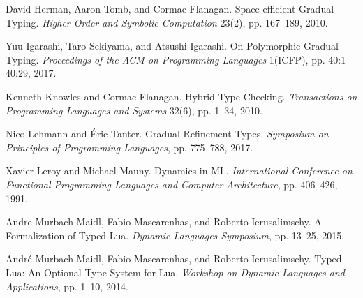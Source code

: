 \documentclass[screen=true, 10pt, acmsmall]{acmart}
\newenvironment{SingleColumn}{\begin{list}{}{\topsep=0pt\partopsep=0pt%
\listparindent=0pt\itemindent=0pt\labelwidth=0pt\leftmargin=0pt\rightmargin=0pt%
\itemsep=0pt\parsep=0pt}\item}{\end{list}}
\newenvironment{AutoBibliography}{\begin{small}}{\end{small}}
\newcommand{\Autobibentry}[1]{\hspace{0.05\linewidth}\parbox[t]{0.95\linewidth}{\parindent=-0.05\linewidth#1\vspace{1.0ex}}}
\begin{document}
\begin{AutoBibliography}
\begin{SingleColumn}
\label{t:x28autobib_x22David_Hermanx2c_Aaron_Tombx2c_and_Cormac_FlanaganSpacex2defficient_Gradual_TypingHigherx2dOrder_and_Symbolic_Computation_23x282x29x2c_ppx2e_167x2dx2d1892010x22x29}\Autobibentry{David Herman, Aaron Tomb, and Cormac Flanagan. Space{-}efficient Gradual Typing. \textit{Higher{-}Order and Symbolic Computation} 23(2), pp. 167{--}189, 2010.}

\label{t:x28autobib_x22Yuu_Igarashix2c_Taro_Sekiyamax2c_and_Atsushi_IgarashiOn_Polymorphic_Gradual_TypingProceedings_of_the_ACM_on_Programming_Languages_1x28ICFPx29x2c_ppx2e_40x3a1x2dx2d40x3a292017x22x29}\Autobibentry{Yuu Igarashi, Taro Sekiyama, and Atsushi Igarashi. On Polymorphic Gradual Typing. \textit{Proceedings of the ACM on Programming Languages} 1(ICFP), pp. 40:1{--}40:29, 2017.}

\label{t:x28autobib_x22Kenneth_Knowles_and_Cormac_FlanaganHybrid_Type_CheckingTransactions_on_Programming_Languages_and_Systems_32x286x29x2c_ppx2e_1x2dx2d342010x22x29}\Autobibentry{Kenneth Knowles and Cormac Flanagan. Hybrid Type Checking. \textit{Transactions on Programming Languages and Systems} 32(6), pp. 1{--}34, 2010.}

\label{t:x28autobib_x22Nico_Lehmann_and_xc9ric_TanterGradual_Refinement_TypesSymposium_on_Principles_of_Programming_Languagesx2c_ppx2e_775x2dx2d7882017x22x29}\Autobibentry{Nico Lehmann and \'{E}ric Tanter. Gradual Refinement Types. \textit{Symposium on Principles of Programming Languages}, pp. 775{--}788, 2017.}

\label{t:x28autobib_x22Xavier_Leroy_and_Michael_MaunyDynamics_in_MLInternational_Conference_on_Functional_Programming_Languages_and_Computer_Architecturex2c_ppx2e_406x2dx2d4261991x22x29}\Autobibentry{Xavier Leroy and Michael Mauny. Dynamics in ML. \textit{International Conference on Functional Programming Languages and Computer Architecture}, pp. 406{--}426, 1991.}

\label{t:x28autobib_x22Andre_Murbach_Maidlx2c_Fabio_Mascarenhasx2c_and_Roberto_IerusalimschyA_Formalization_of_Typed_LuaDynamic_Languages_Symposiumx2c_ppx2e_13x2dx2d252015x22x29}\Autobibentry{Andre Murbach Maidl, Fabio Mascarenhas, and Roberto Ierusalimschy. A Formalization of Typed Lua. \textit{Dynamic Languages Symposium}, pp. 13{--}25, 2015.}

\label{t:x28autobib_x22Andrxe9_Murbach_Maidlx2c_Fabio_Mascarenhasx2c_and_Roberto_IerusalimschyTyped_Luax3a_An_Optional_Type_System_for_LuaWorkshop_on_Dynamic_Languages_and_Applicationsx2c_ppx2e_1x2dx2d102014x22x29}\Autobibentry{Andr\'{e} Murbach Maidl, Fabio Mascarenhas, and Roberto Ierusalimschy. Typed Lua: An Optional Type System for Lua. \textit{Workshop on Dynamic Languages and Applications}, pp. 1{--}10, 2014.}


\end{SingleColumn}
\end{AutoBibliography}
\end{document}

